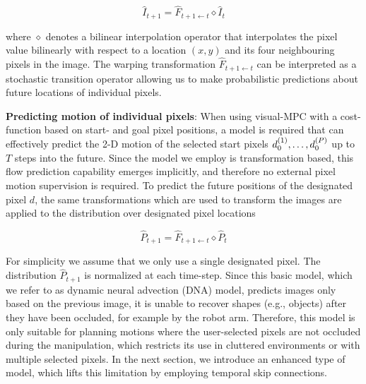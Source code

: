 

\begin{equation}
\hat{I}_{t+1} = \hat{F}_{t+1 \leftarrow t} \diamond  \hat{I}_t 
\label{simple_dna}
\end{equation}

where $\diamond$ denotes a bilinear interpolation operator that interpolates the pixel value bilinearly with respect to a location $(x,y)$ and its four neighbouring pixels in the image. The warping transformation $\hat{F}_{t+1 \leftarrow t}$ can be interpreted as a stochastic transition operator allowing us to make probabilistic predictions about future locations of individual pixels. 

\textbf{Predicting motion of individual pixels}: 
When using visual-MPC with a cost-function based on start- and goal pixel positions, a model is required that can effectively predict the 2-D motion of the selected start pixels $d_0^{(1)}, \dots, d_0^{(P)}$ up to $T$ steps into the future. Since the model we employ is transformation based, this flow prediction capability emerges implicitly, and therefore no external pixel motion supervision is required. To predict the future positions of the designated pixel $d$, the same transformations which are used to transform the images are applied to the distribution over designated pixel locations 

\begin{equation}
\hat{P}_{t+1} = \hat{F}_{t+1 \leftarrow t} \diamond  \hat{P}_t
\label{eqn:prob_forward}
\end{equation}

For simplicity we assume that we only use a single designated pixel. The distribution $\hat{P}_{t+1}$ is normalized at each time-step. Since this basic model, which we refer to as dynamic neural advection (DNA) model, predicts images only based on the previous image, it is unable to recover shapes (e.g., objects) after they have been occluded, for example by the robot arm. Therefore, this model is only suitable for planning motions where the user-selected pixels are not occluded during the manipulation, which restricts its use in cluttered environments or with multiple selected pixels. In the next section, we introduce an enhanced type of model, which lifts this limitation by employing temporal skip connections.

